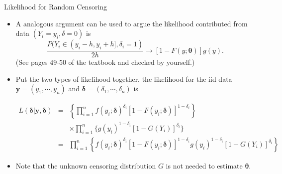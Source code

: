 \documentclass{beamer}
\begin{document}
    
            \begin{frame}{Likelihood for Random Censoring}
        \begin{itemize}
            \item A analogous argument can be used to argue the likelihood contributed from data $(Y_{i} = y_{i}, \delta = 0)$ is 
            $$\frac{P(Y_{i} \in (y_{i} - h, y_{i} + h], \delta_{i} = 1)}{2h} \rightarrow [1-F(y; \boldsymbol{\theta})] g(y).$$
            (See pages 49-50 of the textbook and checked by yourself.)
            
            \item Put the two types of likelihood together, the likelihood for the iid data $\boldsymbol{y} = (y_{1}, \cdots, y_{n})$ and $\boldsymbol{\delta} = (\delta_{1}, \cdots, \delta_{n})$ is  
   \begin{small}
     \begin{eqnarray}
         L(\boldsymbol{\delta}| \boldsymbol{y}, \boldsymbol{\delta})    & = &   \left\{\prod^{n}_{i=1}f(y_{i};\boldsymbol{\delta})^{\delta_{i}}\left[1-F(y_{i};\boldsymbol{\delta})\right]^{1-\delta_{i}}\right\} \nonumber\\
        & & \times \prod^{n}_{i=1}\{g(y_{i})^{1-\delta_{i}}[1-G(Y_{i})]^{\delta_{i}}\} \nonumber\\
        & = &  \prod^{n}_{i=1}\left\{f(y_{i};\boldsymbol{\delta})^{\delta_{i}}\left[1-F(y_{i};\boldsymbol{\delta})\right]^{1-\delta_{i}}g(y_{i})^{1-\delta_{i}}[1-G(Y_{i})]^{\delta_{i}}\right\}  \nonumber
            \end{eqnarray}
   \end{small}
      \item Note that the unknown censoring distribution $G$ is not needed to estimate $\boldsymbol{\theta}$.

            
        \end{itemize}
    \end{frame}
    
\end{document}
